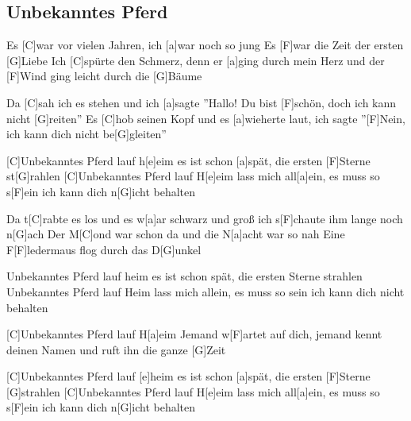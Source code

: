 \subsection*{Unbekanntes Pferd   }
\begin{guitar}

Es [C]war vor vielen Jahren, ich [a]war noch so jung
Es [F]war die Zeit der ersten [G]Liebe
Ich [C]spürte den Schmerz, denn er [a]ging durch mein Herz
und der [F]Wind ging leicht durch die [G]Bäume

Da [C]sah ich es stehen und ich [a]sagte ''Hallo!
Du bist [F]schön, doch ich kann nicht [G]reiten''
Es [C]hob seinen Kopf und es [a]wieherte laut,
ich sagte ''[F]Nein, ich kann dich nicht be[G]gleiten''



[C]Unbekanntes Pferd lauf h[e]eim
es ist schon [a]spät, die ersten [F]Sterne st[G]rahlen
[C]Unbekanntes Pferd lauf H[e]eim
lass mich all[a]ein, es muss so s[F]ein
ich kann dich n[G]icht behalten



Da t[C]rabte es los und es w[a]ar schwarz und groß
ich s[F]chaute ihm lange noch n[G]ach
Der M[C]ond war schon da und die N[a]acht war so nah
Eine F[F]ledermaus flog durch das D[G]unkel



Unbekanntes Pferd lauf heim
es ist schon spät, die ersten Sterne strahlen
Unbekanntes Pferd lauf Heim
lass mich allein, es muss so sein
ich kann dich nicht behalten

[C]Unbekanntes Pferd lauf H[a]eim
Jemand w[F]artet auf dich, jemand kennt deinen Namen
und ruft ihn die ganze [G]Zeit

									


[C]Unbekanntes Pferd lauf [e]heim
es ist schon [a]spät, die ersten [F]Sterne [G]strahlen
[C]Unbekanntes Pferd lauf H[e]eim
lass mich all[a]ein, es muss so s[F]ein
ich kann dich n[G]icht behalten
\end{guitar}

